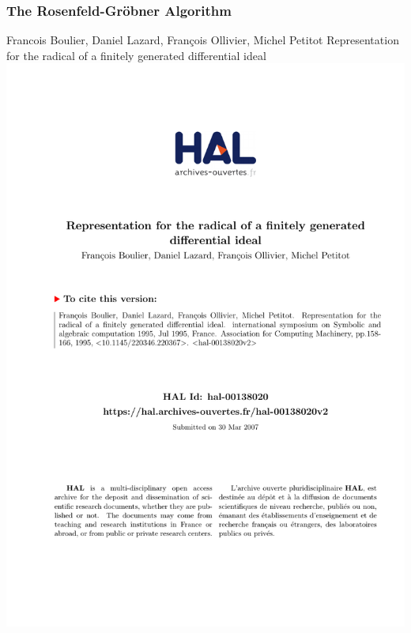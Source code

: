\documentclass{beamer}
\begin{document}
\begin{frame}
\frametitle{The Rosenfeld-Gr\"obner Algorithm}
\begin{exampleblock}{Francois Boulier, Daniel Lazard, François Ollivier, Michel Petitot
Representation for the radical of a finitely generated differential ideal
}
\includegraphics[page=2, clip, trim=0in 0in 0in 5.2in, width=\textwidth]{blop.pdf}
\end{exampleblock}
\end{frame}
\end{document}
